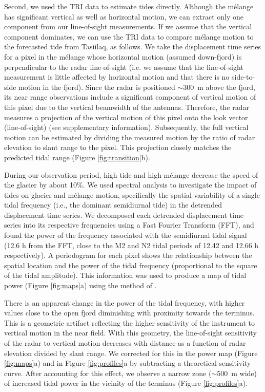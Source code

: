 \documentclass[review]{igs}
\begin{document}
Second, we used the TRI data to estimate tides directly. Although the m\'elange has significant vertical as well as horizontal motion, we can extract only one component from our line-of-sight measurements.  If we assume that the vertical component dominates, we can use the TRI data to compare m\'elange motion to the forecasted tide from Tasiilaq, as follows. We take the displacement time series for a pixel in the m\'elange whose horizontal motion (assumed down-fjord) is perpendicular to the radar line-of-sight (i.e. we assume that the line-of-sight measurement is little affected by horizontal motion and that there is no side-to-side motion in the fjord).  Since the radar is positioned $\sim$300~m above the fjord, its near range observations include a significant component of vertical motion of this pixel due to the vertical beamwidth of the antennas. Therefore, the radar measures a projection of the vertical motion of this pixel onto the look vector (line-of-sight) (see supplementary information).  Subsequently, the full vertical motion can be estimated by dividing the measured motion by the ratio of radar elevation to slant range to the pixel. This projection closely matches the predicted tidal range (Figure \ref{fig:transition}b). 


During our observation period, high tide and high m\'elange decrease the speed of the glacier by about 10\%.  We used spectral analysis to investigate the impact of tides on glacier and m\'elange motion, specifically the spatial variability of a single tidal frequency (i.e., the dominant semidiurnal tide) in the detrended displacement time series. We decomposed each detrended displacement time series into its respective frequencies using a Fast Fourier Transform (FFT), and found the power of the frequency associated with the semidiurnal tidal signal (12.6 h from the FFT, close to the M2 and N2 tidal periods of 12.42 and 12.66 h respectively). A periodogram for each pixel shows the relationship between the spatial location and the power of the tidal frequency (proportional to the square of the tidal amplitude). This information was used to produce a map of tidal power (Figure \ref{fig:maps}a) using the method of \citet{glover2011modeling}. 

There is an apparent change in the power of the tidal frequency, with higher values close to the open fjord diminishing with proximity towards the terminus. This is a geometric artifact reflecting the higher sensitivity of the instrument to vertical motion in the near field.  With this geometry, the line-of-sight sensitivity of the radar to vertical motion decreases with distance as a function of radar elevation divided by slant range. We corrected for this in the power map (Figure \ref{fig:maps}a) and in Figure \ref{fig:profiles}a by subtracting a theoretical sensitivity curve. After accounting for this effect, we observe a narrow zone ($\sim$500~m wide) of increased tidal power in the vicinity of the terminus (Figure \ref{fig:profiles}a).
\end{document}
